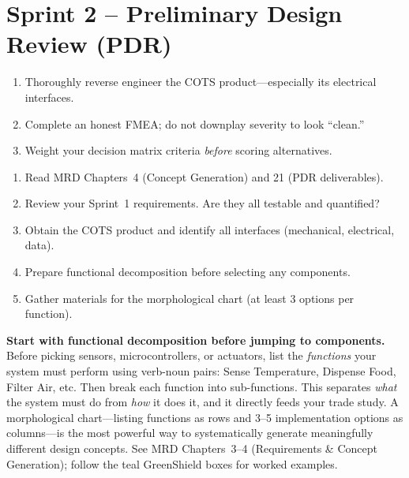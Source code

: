 \section{Sprint 2 -- Preliminary Design Review (PDR)}

\begin{priorities}
\begin{enumerate}[leftmargin=*, itemsep=1pt, topsep=0pt]
    \item Thoroughly reverse engineer the COTS product---especially its electrical interfaces.
    \item Complete an honest FMEA; do not downplay severity to look ``clean.''
    \item Weight your decision matrix criteria \textit{before} scoring alternatives.
\end{enumerate}
\end{priorities}

\begin{checklistbox}
\begin{enumerate}[leftmargin=*, itemsep=1pt, topsep=0pt]
    \item Read MRD Chapters~4 (Concept Generation) and 21 (PDR deliverables).
    \item Review your Sprint~1 requirements. Are they all testable and quantified?
    \item Obtain the COTS product and identify all interfaces (mechanical, electrical, data).
    \item Prepare functional decomposition before selecting any components.
    \item Gather materials for the morphological chart (at least 3 options per function).
\end{enumerate}
\end{checklistbox}

\begin{protip}
\textbf{Start with functional decomposition before jumping to components.} Before picking sensors, microcontrollers, or actuators, list the \textit{functions} your system must perform using verb-noun pairs: Sense Temperature, Dispense Food, Filter Air, etc. Then break each function into sub-functions. This separates \textit{what} the system must do from \textit{how} it does it, and it directly feeds your trade study. A morphological chart---listing functions as rows and 3--5 implementation options as columns---is the most powerful way to systematically generate meaningfully different design concepts. See MRD Chapters~3--4 (Requirements \& Concept Generation); follow the teal GreenShield boxes for worked examples.
\end{protip}

